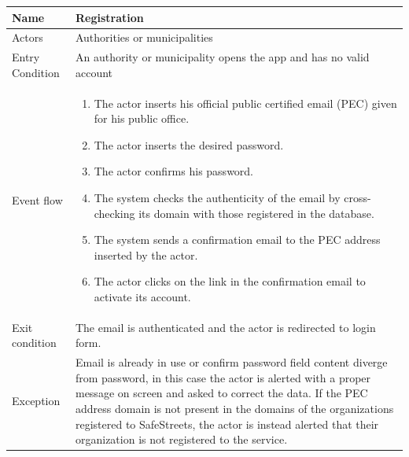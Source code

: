 \vskip 0.2in
\begin{tabular}{|p{3.1cm}|p{11.6cm}|}
\hline
Name & Registration\\
\hline
Actors & Authorities or municipalities\\
\hline
Entry Condition & An authority or municipality opens the app and has no valid account\\
\hline
Event flow & \begin{enumerate}
                \item The actor inserts his official public certified email (PEC) given for his public office.
                \item The actor inserts the desired password.
                \item The actor confirms his password.
                \item The system checks the authenticity of the email by cross-checking its domain with those registered in the database.
                \item The system sends a confirmation email to the PEC address inserted by the actor.
                \item The actor clicks on the link in the confirmation email to activate its account.
            \end{enumerate}\\
\hline
Exit condition & The email is authenticated and the actor is redirected to login form.\\
\hline
Exception & Email is already in use or confirm password field content diverge from password, in this case the actor is alerted with a proper message on screen and asked to correct the data. If the PEC address domain is not present in the domains of the organizations registered to SafeStreets, the actor is instead alerted that their organization is not registered to the service. \\
\hline
\end{tabular}

